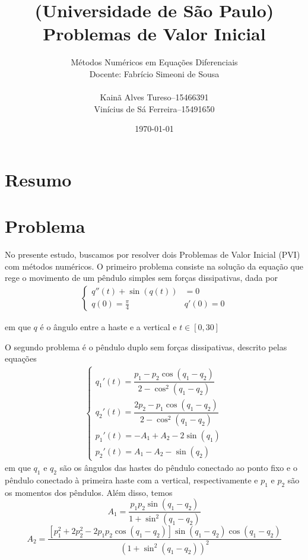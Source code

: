\documentclass{article}
\title{(Universidade de São Paulo)\\
Problemas de Valor Inicial}
\author{Métodos Numéricos em Equações Diferenciais\\
Docente: Fabrício Simeoni de Sousa\\[.2cm]
\begin{tabular}{r@{\ }c@{\ }l}
    Kainã Alves Tureso      &-- &15466391\\
    Vinícius de Sá Ferreira &-- &15491650
\end{tabular}}
\date{\today}
\begin{document}
    \maketitle

    \tableofcontents

    \section{Resumo}

    \section{Problema}
    No presente estudo, buscamos por resolver dois Problemas de Valor Inicial (PVI) com métodos numéricos. O primeiro problema consiste na solução da equação que rege o movimento de um pêndulo simples sem forças dissipativas, dada por
    \begin{align}
        \begin{cases}
            q''(t) + \sin(q(t)) &= 0 \\
            q(0) = \frac{\pi}{4} & q'(0) = 0
        \end{cases} \label{eq:pendulo_simples}
    \end{align}

    em que $q$ é o ângulo entre a haste e a vertical e $t \in [0,30]$

    O segundo problema é o pêndulo duplo sem forças dissipativas, descrito pelas equações
    \begin{align}
        \begin{cases}
            q_1'(t) = \dfrac{p_1 - p_2 \cos(q_1 - q_2)}{2 - \cos^2(q_1 - q_2)} \\
            q_2'(t) = \dfrac{2p_2 - p_1 \cos(q_1 - q_2)}{2 - \cos^2(q_1 - q_2)} \\
            p_1'(t) = -A_1 + A_2 - 2\sin(q_1)\\
            p_2'(t) = A_1 - A_2 - \sin(q_2)
        \end{cases} \label{eq:pendulo_duplo}
    \end{align}
    em que $q_1$ e $q_2$ são os ângulos das hastes do pêndulo conectado ao ponto fixo e o pêndulo conectado à primeira haste com a vertical, respectivamente e $p_1$ e $p_2$ são os momentos dos pêndulos. Além disso, temos
    \[
        A_1 = \dfrac{p_1p_2\sin(q_1 - q_2)}{1 + \sin^2(q_1 - q_2)} 
    \]
    \[
        A_2 = \dfrac{[p_1^2 + 2p_2^2 - 2p_1p_2 \cos(q_1 - q_2)] \sin(q_1 - q_2) \cos(q_1 - q_2)}{(1+ \sin^2(q_1 - q_2))^2}
    \]
\end{document}
